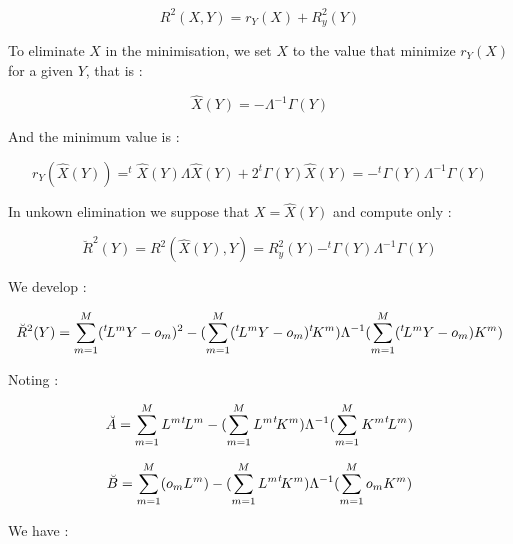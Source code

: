\begin{equation}
      R^2 (X,Y) =   r_Y(X) +    R_y^2 (Y)  
\end{equation}



To eliminate $X$ in the minimisation, we set $X$  to the value that minimize $r_Y(X)$ for a given  $Y$,
that is :

\begin{equation}
    \hat{X}(Y) = -  \Lambda^{-1}  \Gamma(Y)
    \label{Eq:XHatOfY}
\end{equation}

And the minimum value is :

\begin{equation}
    r_Y(\hat{X}(Y)) 
    = ^t\hat{X}(Y)  \Lambda  \hat{X}(Y)    + 2   ^t \Gamma(Y)  \hat{X}(Y) 
   =   - ^t \Gamma(Y) \Lambda^{-1} \Gamma(Y)
\end{equation}


In unkown elimination we suppose that $X=\hat{X}(Y)$ and compute only : 

\begin{equation}
      \breve{R}^2 (Y) = R^2(\hat{X}(Y),Y)  =     R_y^2 (Y)   -  ^t \Gamma(Y) \Lambda^{-1} \Gamma(Y)
\end{equation}

We develop :

\begin{equation}    \breve{R}^2 (Y) =
                       \sum\limits_{m=1}^M  (^{t} \! L^m Y - o_m  ) ^2
                  -    (\sum\limits_{m=1}^M  (^{t} \! L^m Y - o_m  )  ^{t} \! K^m )  
                       \Lambda^{-1}
                       (\sum\limits_{m=1}^M  (^{t} \! L^m Y - o_m  )  K^m ) 
\end{equation}

Noting :


\begin{equation}  
     \breve{A} =  \sum\limits_{m=1}^M{L^m}{^{t} \! L^m}
               -(\sum\limits_{m=1}^M {L^m} ^{t} \! {K^m})   \Lambda^{-1}  (\sum\limits_{m=1}^M   {K^m} ^{t} \! {L^m} ) 
\end{equation}  

\begin{equation}  
     \breve{B}  =   \sum\limits_{m=1}^M (o_m L^m ) 
                - (\sum\limits_{m=1}^M  {L^m}  ^{t} \! K^m) \Lambda^{-1}  (\sum\limits_{m=1}^M o_m K^m )
\label{Var:BChap}
\end{equation}  

We have :


